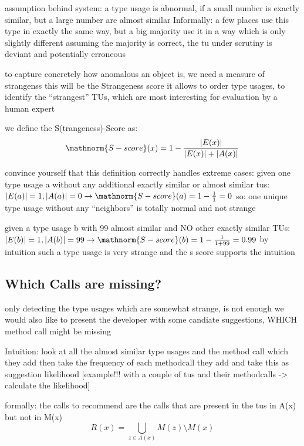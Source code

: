 assumption behind system:
a type usage is abnormal, if a small number is exactly similar, but a large number are almost similar
Informally: a few places use this type in exactly the same way, but a big majority use it in a way which is only slightly different
assuming the majority is correct, the tu under scrutiny is deviant and potentially erroneous

to capture concretely how anomalous an object is, we need a measure of strangenss
this will be the Strangeness score
it allows to order type usages, to identify the ``strangest'' TUs, which are most interesting for evaluation by a human expert

we define the S(trangeness)-Score as:
\begin{equation*}
    \mathnorm{S-score}(x) = 1 - \frac{|E(x)|}{|E(x)|+|A(x)|}
\end{equation*}

convince yourself that this definition correctly handles extreme cases:
given one type usage a without any additional exactly similar or almost similar tus: $|E(a)| = 1, |A(a)|=0 \rightarrow \mathnorm{S-score}(a) = 1-\frac{1}{1} = 0$
so: one unique type usage without any ``neighbors'' is totally normal and not strange

given a type usage b with 99 almost similar and NO other exactly similar TUs: $|E(b)| = 1, |A(b)| = 99 \rightarrow \mathnorm{S-score}(b) = 1-\frac{1}{1+99} = 0.99$
by intuition such a type usage is very strange and the s score supports the intuition

\subsection{Which Calls are missing?}

only detecting the type usages which are somewhat strange, is not enough
we would also like to present the developer with some candiate suggestions, WHICH method call might be missing

Intuition: look at all the almost similar type usages and the method call which they add
then take the frequency of each methodcall they add and take this as suggestion likelihood
[example!!! with a couple of tus and their methodcalls -> calculate the likelihood]

formally:
the calls to recommend are the calls that are present in the tus in A(x) but not in M(x)
\begin{equation*}
    R(x) = \bigcup_{z \in A(x)} M(z) \setminus M(x)
\end{equation*}

